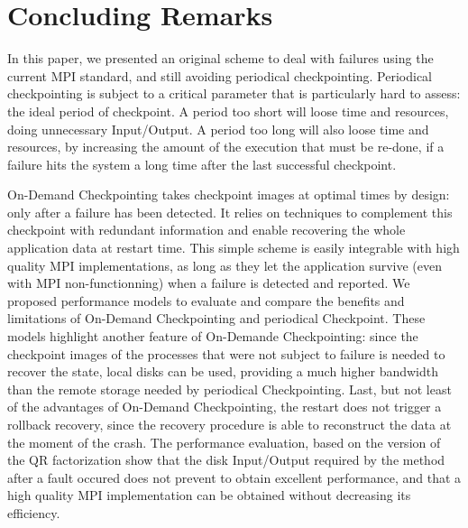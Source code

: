 \section{Concluding Remarks}

In this paper, we presented an original scheme to deal with failures
using the current MPI standard, and still avoiding periodical
checkpointing. Periodical checkpointing is subject to a critical
parameter that is particularly hard to assess: the ideal period of
checkpoint. A period too short will loose time and resources, doing
unnecessary Input/Output. A period too long will also loose time and
resources, by increasing the amount of the execution that must be
re-done, if a failure hits the system a long time after the last
successful checkpoint.

On-Demand Checkpointing takes checkpoint images at optimal times by
design: only after a failure has been detected. It relies on \abft
techniques to complement this checkpoint with redundant information
and enable recovering the whole application data at restart
time. This simple scheme is easily integrable with high quality MPI
implementations, as long as they let the application survive (even
with MPI non-functionning) when a failure is detected and reported. We
proposed performance models to evaluate and compare the benefits and
limitations of On-Demand Checkpointing and periodical
Checkpoint. These models highlight another feature of On-Demande
Checkpointing: since the checkpoint images of the processes that were
not subject to failure is needed to recover the state, local disks can
be used, providing a much higher bandwidth than the remote storage
needed by periodical Checkpointing. Last, but not least of the
advantages of On-Demand Checkpointing, the restart does not trigger a
rollback recovery, since the recovery procedure is able to reconstruct
the data at the moment of the crash.  The performance evaluation,
based on the \abft version of the QR factorization show that the
disk Input/Output required by the method after a fault occured does
not prevent to obtain excellent performance, and that a high quality
MPI implementation can be obtained without decreasing its efficiency.
